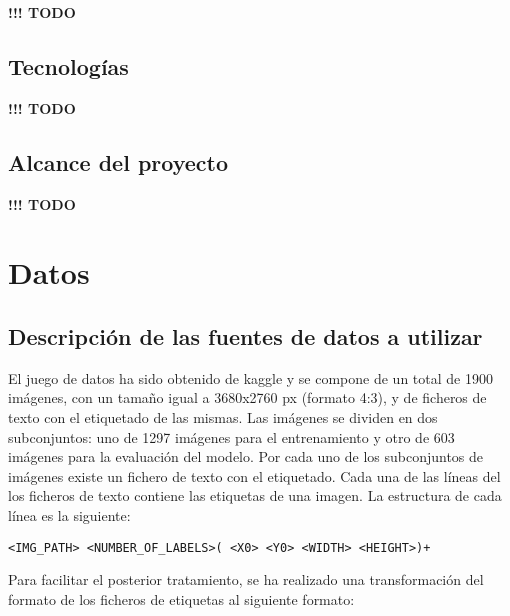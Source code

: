 \documentclass[]{article}
\begin{document}

\textbf{!!! TODO}

\subsection{Tecnologías}


\textbf{!!! TODO}

\subsection{Alcance del proyecto}


\textbf{!!! TODO}

\section{Datos}


\subsection{Descripción de las fuentes de datos a utilizar}

El juego de datos ha sido obtenido de kaggle \cite{potholedataset} y se compone de un total de 1900 imágenes, con un tamaño igual a 3680x2760 px (formato 4:3), y de ficheros de texto con el etiquetado de las mismas. Las imágenes se dividen en dos subconjuntos: uno de 1297 imágenes para el entrenamiento y otro de 603 imágenes para la evaluación del modelo. Por cada uno de los subconjuntos de imágenes existe un fichero de texto con el etiquetado. Cada una de las líneas del los ficheros de texto contiene las etiquetas de una imagen. La estructura de cada línea es la siguiente:

\begin{lstlisting}[frame=single,basicstyle=\ttfamily\footnotesize]
<IMG_PATH> <NUMBER_OF_LABELS>( <X0> <Y0> <WIDTH> <HEIGHT>)+
\end{lstlisting}

Para facilitar el posterior tratamiento, se ha realizado una transformación del formato de los ficheros de etiquetas al siguiente formato:
\end{document}
